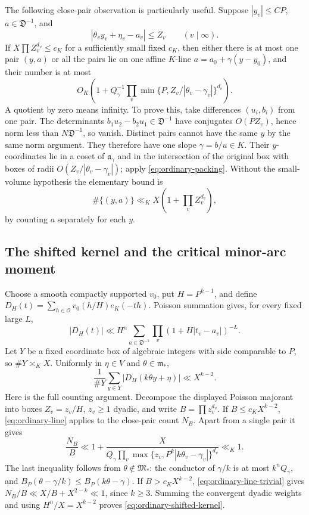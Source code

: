 \documentclass[11pt]{amsart}
\theoremstyle{definition}
\numberwithin{equation}{section}
\begin{document}
The following close-pair observation is particularly useful.  Suppose
$|y_v|\le C P$, $a\in\mathfrak D^{-1}$, and
\[
 |\theta_vy_v+\eta_v-a_v|\le Z_v\qquad(v\mid\infty).
\]
If $X\prod Z_v^{d_v}\le c_K$ for a sufficiently small fixed $c_K$, then either
there is at most one pair $(y,a)$ or all the pairs lie on one affine $K$-line
$a=a_0+\gamma(y-y_0)$, and their number is at most
\begin{equation}\label{eq:ordinary-line}
 O_K\left(1+Q_\gamma^{-1}
       \prod_v\min\{P,Z_v/|\theta_v-\gamma_v|\}^{d_v}\right).
\end{equation}
A quotient by zero means infinity.
To prove this, take differences $(u_i,b_i)$ from one pair.
The determinants $b_1u_2-b_2u_1\in\mathfrak D^{-1}$ have conjugates
$O(PZ_v)$, hence norm less than $N\mathfrak D^{-1}$, so vanish.
Distinct pairs cannot have the same $y$ by the same norm argument.
They therefore have one slope $\gamma=b/u\in K$.
Their $y$-coordinates lie in a coset of $\mathfrak a_\gamma$ and in the
intersection of the original box with boxes of radii
$O(Z_v/|\theta_v-\gamma_v|)$; apply \eqref{eq:ordinary-packing}.
Without the small-volume hypothesis the elementary bound is
\begin{equation}\label{eq:ordinary-line-trivial}
 \#\{(y,a)\}\ll_K X\left(1+\prod_v Z_v^{d_v}\right),
\end{equation}
by counting $a$ separately for each $y$.

\subsection{The shifted kernel and the critical minor-arc moment}

Choose a smooth compactly supported $v_0$, put $H=P^{k-1}$, and define
$D_H(t)=\sum_{h\in\mathcal O}v_0(h/H)e_K(-th)$.
Poisson summation gives, for every fixed large $L$,
\[
 |D_H(t)|\ll H^n\sum_{a\in\mathfrak D^{-1}}
             \prod_v(1+H|t_v-a_v|)^{-L}.
\]
Let $Y$ be a fixed coordinate box of algebraic integers with side comparable
to $P$, so $\#Y\asymp_KX$.  Uniformly in $\eta\in V$ and
$\theta\in\mathfrak m_*$,
\begin{equation}\label{eq:ordinary-shifted-kernel}
 \frac1{\#Y}\sum_{y\in Y}|D_H(k\theta y+\eta)|\ll X^{k-2}.
\end{equation}
Here is the full counting argument.
Decompose the displayed Poisson majorant into boxes
$Z_v=z_v/H$, $z_v\ge1$ dyadic, and write $B=\prod z_v^{d_v}$.
If $B\le c_KX^{k-2}$, \eqref{eq:ordinary-line} applies to the close-pair
count $N_B$.  Apart from a single pair it gives
\[
 \frac{N_B}{B}\ll 1+
 \frac{X}{Q_\gamma
   \prod_v\max\{z_v,P^k|k\theta_v-\gamma_v|\}^{d_v}}
 \ll_K1.
\]
The last inequality follows from $\theta\notin\mathfrak M_*$:
the conductor of $\gamma/k$ is at most $k^nQ_\gamma$, and
$B_P(\theta-\gamma/k)\le B_P(k\theta-\gamma)$.
If $B>c_KX^{k-2}$, \eqref{eq:ordinary-line-trivial} gives
$N_B/B\ll X/B+X^{2-k}\ll1$, since $k\ge3$.
Summing the convergent dyadic weights and using $H^n/X=X^{k-2}$ proves
\eqref{eq:ordinary-shifted-kernel}.
\end{document}
